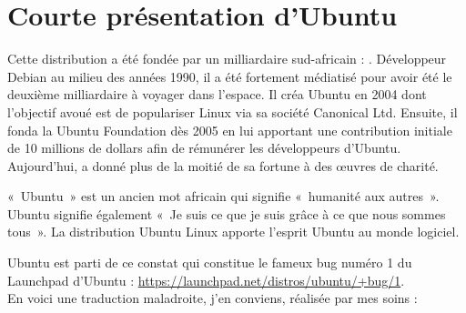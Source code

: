 \section{Courte présentation d'Ubuntu}
Cette distribution a été fondée par un milliardaire sud-africain : . Développeur Debian au milieu des années 1990, il a été fortement médiatisé pour avoir été le deuxième milliardaire à voyager dans l'espace. Il créa Ubuntu en 2004 dont l'objectif avoué est de populariser Linux via sa société Canonical Ltd. Ensuite, il fonda la Ubuntu Foundation dès 2005 en lui apportant une contribution initiale de 10 millions de dollars afin de rémunérer les développeurs d'Ubuntu. Aujourd'hui,  a donné plus de la moitié de sa fortune à des œuvres de charité.\par
«~Ubuntu~» est un ancien mot africain qui signifie «~humanité aux autres~». Ubuntu signifie également «~Je suis ce que je suis grâce à ce que nous sommes tous~». La distribution Ubuntu Linux apporte l'esprit Ubuntu au monde logiciel.\par
Ubuntu est parti de ce constat qui constitue le fameux bug numéro 1 du Launchpad d'Ubuntu  : \url{https://launchpad.net/distros/ubuntu/+bug/1}.\\
En voici une traduction maladroite, j'en conviens, réalisée par mes soins :
